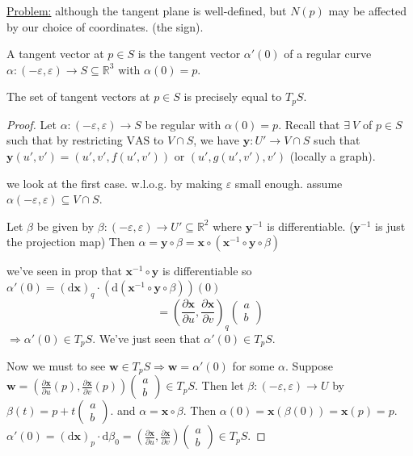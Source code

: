 \documentclass{article}
\begin{document}
\noindent \underline{Problem:} 
although the tangent plane is well-defined, but $N(p)$ may be affected by our choice of coordinates. (the sign).

\begin{definition}
A tangent vector at $p \in S$ is the tangent vector $\alpha'(0)$ of a regular curve $\alpha: (-\varepsilon, \varepsilon) \to S \subseteq \mathbb{R}^3$ with $\alpha(0) = p$.
\end{definition}

\begin{proposition}
The set of tangent vectors at $p \in S$ is precisely equal to $T_p S$.
\end{proposition}

\begin{proof}
Let $\alpha: (-\varepsilon, \varepsilon) \to S$ be regular with $\alpha(0)=p$.
Recall that $\exists \ V$ of $p \in S$ such that by restricting $\text{VAS}$ to $V \cap S$, we have $\mathbf{y}: U' \to V \cap S$
such that $\mathbf{y}(u', v') = (u', v', f(u', v'))$
or $(u', g(u', v'), v')$ (locally a graph).

we look at the first case. w.l.o.g. by making $\varepsilon$ small enough.
assume $\alpha(-\varepsilon, \varepsilon) \subseteq V \cap S$.

Let $\beta$ be given by $\beta: (-\varepsilon, \varepsilon) \to U' \subseteq \mathbb{R}^2$
where $\mathbf{y}^{-1}$ is differentiable. ($\mathbf{y}^{-1}$ is just the projection map)
Then $\alpha = \mathbf{y} \circ \beta = \mathbf{x} \circ (\mathbf{x}^{-1} \circ \mathbf{y} \circ \beta)$

we've seen in prop that $\mathbf{x}^{-1} \circ \mathbf{y}$ is differentiable
so $\alpha'(0) = (\mathrm{d}\mathbf{x})_q \cdot (\mathrm{d}(\mathbf{x}^{-1} \circ \mathbf{y} \circ \beta)) (0)$
\[
= \left( \frac{\partial \mathbf{x}}{\partial u}, \frac{\partial \mathbf{x}}{\partial v} \right)_q \begin{pmatrix} a \\ b \end{pmatrix}
\]
$\Rightarrow \alpha'(0) \in T_p S$.
We've just seen that $\alpha'(0) \in T_p S$.

Now we must to see $\mathbf{w} \in T_p S \Rightarrow \mathbf{w} = \alpha'(0)$ for some $\alpha$.
Suppose $\mathbf{w} = \left( \frac{\partial \mathbf{x}}{\partial u} (p), \frac{\partial \mathbf{x}}{\partial v} (p) \right) \begin{pmatrix} a \\ b \end{pmatrix} \in T_p S$.
Then let $\beta: (-\varepsilon, \varepsilon) \to U$ by $\beta(t) = p + t \begin{pmatrix} a \\ b \end{pmatrix}$.
and $\alpha = \mathbf{x} \circ \beta$. Then $\alpha(0) = \mathbf{x}(\beta(0)) = \mathbf{x}(p) = p$.
$\alpha'(0) = (\mathrm{d}\mathbf{x})_p \cdot \mathrm{d}\beta_0 = \left( \frac{\partial \mathbf{x}}{\partial u}, \frac{\partial \mathbf{x}}{\partial v} \right) \begin{pmatrix} a \\ b \end{pmatrix} \in T_p S$.
\end{proof}
\end{document}
